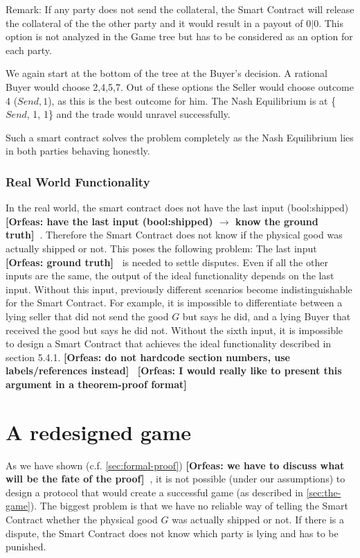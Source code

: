 \documentclass{cacthesis}
\newcommand{\authnote}[3]{{ \footnotesize \textbf{#1[#2: #3]~}}}
\newcommand{\orfnote}[1]{\authnote{\color{blue}}{Orfeas}{#1}}
\begin{document}
Remark: If any party does not send the collateral, the Smart Contract will release the collateral of the the other party and it would result in a payout of $0|0$. This option is not analyzed in the Game tree but has to be considered as an option for each party.\newline

We again start at the bottom of the tree at the Buyer's decision. A rational Buyer would choose 2,4,5,7. Out of these options the Seller would choose outcome 4 ($Send,1$), as this is the best outcome for him.\newline
The Nash Equilibrium is at \{$Send$, 1, 1\} and the trade would unravel successfully.\newline

Such a smart contract solves the problem completely as the Nash Equilibrium lies in both parties behaving honestly.
\subsection{Real World Functionality}
In the real world, the smart contract does not have the last input
(bool:shipped) \orfnote{have the last input (bool:shipped) $\rightarrow$ know
the ground truth}. Therefore the Smart Contract does not know if the physical good was actually shipped or not. \newline
This poses the following problem: The last input \orfnote{ground truth} is needed to settle disputes. Even if all the other inputs are the same, the output of the ideal functionality depends on the last input. Without this input, previously different scenarios become indistinguishable for the Smart Contract.\newline
For example, it is impossible to differentiate between a lying seller that did not send the good $G$ but says he did, and a lying Buyer that received the good but says he did not.\newline 
Without the sixth input, it is impossible to design a Smart Contract that achieves the ideal functionality described in section 5.4.1.
\orfnote{do not hardcode section numbers, use labels/references instead}
\orfnote{I would really like to present this argument in a theorem-proof format}

\chapter{A redesigned game}
As we have shown (c.f. \ref{sec:formal-proof}) \orfnote{we have to discuss what will be the fate of the
proof}, it is not possible (under our assumptions) to design a protocol that would create a successful game (as described in \ref{sec:the-game}). The biggest problem is that we have no reliable way of telling the Smart Contract whether the physical good $G$ was actually shipped or not. If there is a dispute, the Smart Contract does not know which party is lying and has to be punished.\newline
\end{document}
